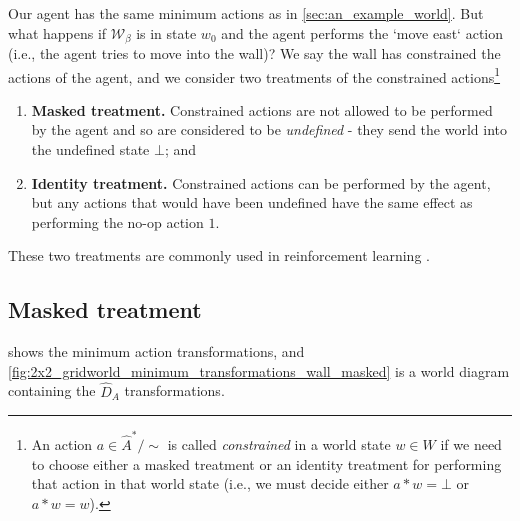Our agent has the same minimum actions as in \cref{sec:an_example_world}.
But what happens if $\mathscr{W}_{\beta}$ is in state $w_{0}$ and the agent performs the `move east` action (i.e., the agent tries to move into the wall)?
We say the wall has constrained the actions of the agent, and we consider two treatments of the constrained actions\footnote{
An action $a \in \hat{A}^{*}/\sim$ is called \emph{constrained} in a world state $w \in W$ if we need to choose either a masked treatment or an identity treatment for performing that action in that world state (i.e., we must decide either $a * w = \bot$ or $a * w = w$).
}
\begin{enumerate}[(1)]
    \item \textbf{Masked treatment.}
    Constrained actions are not allowed to be performed by the agent and so are considered to be \emph{undefined} - they send the world into the undefined state $\bot$; and
    \item \textbf{Identity treatment.}
    Constrained actions can be performed by the agent, but any actions that would have been undefined have the same effect as performing the no-op action $1$.
\end{enumerate}
These two treatments are commonly used in reinforcement learning .

\subsection{Masked treatment}


 shows the minimum action transformations, and \cref{fig:2x2_gridworld_minimum_transformations_wall_masked} is a world diagram containing the $\hat{D}_{A}$ transformations.

